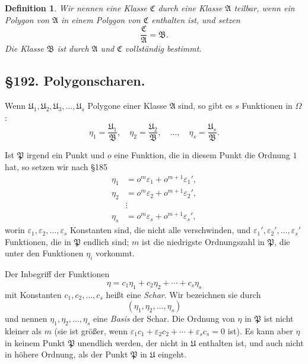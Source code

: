 \documentclass[12pt,a4paper]{article}
\newtheorem*{definition}{Definition}
\begin{document}
\begin{definition}
Wir nennen eine Klasse $\mathfrak{C}$ durch eine Klasse $\mathfrak{A}$ teilbar, wenn ein Polygon von $\mathfrak{A}$ in einem Polygon von $\mathfrak{C}$ enthalten ist, und setzen
\begin{equation}\label{eq:191-6}
\frac{\mathfrak{C}}{\mathfrak{A}} = \mathfrak{B}.
\end{equation}
Die Klasse $\mathfrak{B}$ ist durch $\mathfrak{A}$ und $\mathfrak{C}$ vollständig bestimmt.
\end{definition}

\subsection*{\S 192. Polygonscharen.}

Wenn $\mathfrak{U}_1, \mathfrak{U}_2, \mathfrak{U}_3, \ldots, \mathfrak{U}_s$ Polygone einer Klasse $\mathfrak{A}$ sind, so gibt es $s$ Funktionen in $\Omega$:
\begin{equation}\label{eq:192-1}
\eta_1 = \frac{\mathfrak{U}_1}{\mathfrak{B}}, \quad \eta_2 = \frac{\mathfrak{U}_2}{\mathfrak{B}}, \quad \ldots, \quad \eta_s = \frac{\mathfrak{U}_s}{\mathfrak{B}}.
\end{equation}

Ist $\mathfrak{P}$ irgend ein Punkt und $o$ eine Funktion, die in diesem Punkt die Ordnung $1$ hat, so setzen wir nach \S 185
\begin{equation}\label{eq:192-2}
\begin{aligned}
\eta_1 &= o^m \varepsilon_1 + o^{m+1} \varepsilon_1',\\
\eta_2 &= o^m \varepsilon_2 + o^{m+1} \varepsilon_2',\\
&\vdots\\
\eta_s &= o^m \varepsilon_s + o^{m+1} \varepsilon_s',
\end{aligned}
\end{equation}
worin $\varepsilon_1, \varepsilon_2, \ldots, \varepsilon_s$ Konstanten sind, die nicht alle verschwinden, und $\varepsilon_1', \varepsilon_2', \ldots, \varepsilon_s'$ Funktionen, die in $\mathfrak{P}$ endlich sind; $m$ ist die niedrigste Ordnungszahl in $\mathfrak{P}$, die unter den Funktionen $\eta_i$ vorkommt.

Der Inbegriff der Funktionen
\begin{equation}\label{eq:192-3}
\eta = c_1\eta_1 + c_2\eta_2 + \cdots + c_s\eta_s
\end{equation}
mit Konstanten $c_1, c_2, \ldots, c_s$ heißt eine \emph{Schar}. Wir bezeichnen sie durch
\begin{equation}\label{eq:192-4}
(\eta_1, \eta_2, \ldots, \eta_s)
\end{equation}
und nennen $\eta_1, \eta_2, \ldots, \eta_s$ eine \emph{Basis} der Schar. Die Ordnung von $\eta$ in $\mathfrak{P}$ ist nicht kleiner als $m$ (sie ist größer, wenn $\varepsilon_1 c_1 + \varepsilon_2 c_2 + \cdots + \varepsilon_s c_s = 0$ ist). Es kann aber $\eta$ in keinem Punkt $\mathfrak{P}$ unendlich werden, der nicht in $\mathfrak{U}$ enthalten ist, und auch nicht in höhere Ordnung, als der Punkt $\mathfrak{P}$ in $\mathfrak{U}$ eingeht.
\end{document}
